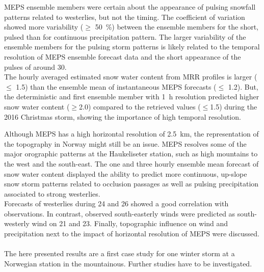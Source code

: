 MEPS ensemble members were certain about the appearance of pulsing snowfall patterns related to westerlies, but not the timing. 
The coefficient of variation showed more variability ($\ge$ \SI{50}{\percent}) between the ensemble members for the short, pulsed than for continuous precipitation pattern. The larger variability of the ensemble members for the pulsing storm patterns is likely related to the temporal resolution of MEPS ensemble forecast data and the short appearance of the pulses of around \SI{30}{\min}.
\\
The hourly averaged estimated snow water content from MRR profiles is larger ($\le$ \SI{1.5}{\SWC}) than the ensemble mean of instantaneous MEPS forecasts ($\le$ \SI{1.2}{\SWC}). %
But, the deterministic and first ensemble member with \SI{1}{\hour} resolution predicted higher snow water content ($\ge$\SI{2.0}{\SWC}) compared to the retrieved values ($\le$\SI{1.5}{\SWC}) %
during the 2016 Christmas storm, showing the importance of high temporal resolution.
\par\medskip
\noindent
Although MEPS has a high horizontal resolution of \SI{2.5}{\km}, the representation of the %
topography in Norway might still be an issue. MEPS %
resolves some of the major orographic patterns at the Haukeliseter station, such as high mountains to the west and the south-east. %
The one and three hourly ensemble mean forecast of snow water content displayed the ability to predict more continuous, up-slope snow storm patterns related to occlusion passages as well as pulsing precipitation associated to strong westerlies.
\\
Forecasts of westerlies during \num{24} and \SI{26}{\dec} showed a good correlation with observations. In contrast, observed south-easterly winds were predicted as south-westerly wind on \num{21} and \SI{23}{\dec}. %
Finally, topographic influence on wind and precipitation %
next to the impact of horizontal resolution of MEPS were discussed. %
\\
\\
The here presented results are a first case study for one winter storm at a Norwegian station in the mountainous. Further studies have to be investigated. 



